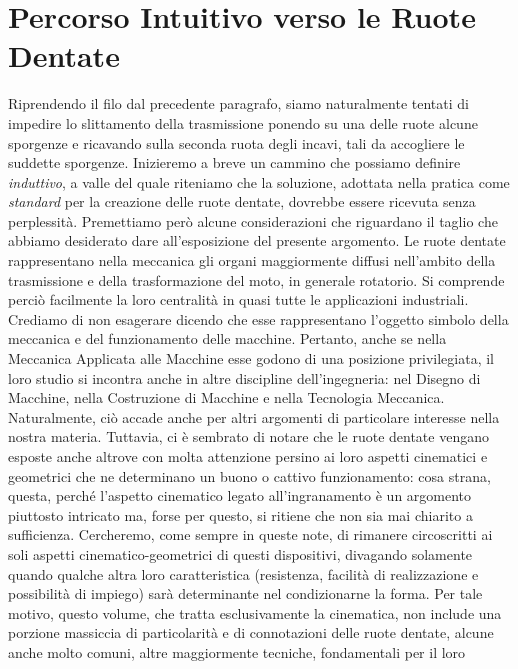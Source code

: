 \section{Percorso Intuitivo verso le Ruote Dentate} \label{percorso-ruote}

\noindent Riprendendo il filo dal precedente paragrafo,
siamo naturalmente tentati di impedire lo slittamento della trasmissione
ponendo su una delle ruote
alcune sporgenze e ricavando sulla seconda ruota degli incavi, tali da accogliere
le suddette sporgenze.
Inizieremo a breve un cammino che possiamo definire {\em induttivo}, a valle
del quale riteniamo che la soluzione,
adottata nella pratica come {\em standard} per la creazione delle
ruote dentate, dovrebbe essere ricevuta senza perplessit\`a. 
Premettiamo per\`o alcune considerazioni che riguardano il taglio che abbiamo
desiderato dare all'esposizione del presente argomento.
Le ruote dentate rappresentano nella meccanica gli organi maggiormente
diffusi nell'ambito della trasmissione e della trasformazione del moto, in
generale rotatorio. Si comprende perci\`o facilmente la loro
centralit\`a
in quasi tutte le applicazioni industriali. Crediamo di non esagerare dicendo
che esse rappresentano l'oggetto simbolo della meccanica e del funzionamento
delle macchine.
Pertanto, anche se nella Meccanica Applicata alle Macchine esse godono di una
posizione privilegiata, il loro studio si incontra anche in altre discipline
dell'ingegneria: nel Disegno di Macchine, nella Costruzione di Macchine e nella
Tecnologia Meccanica. Naturalmente, ci\`o accade anche per altri argomenti
di particolare interesse nella nostra 
materia. Tuttavia, ci \`e sembrato di notare 
che le ruote dentate vengano esposte anche altrove
con molta attenzione persino ai loro aspetti cinematici
e geometrici che ne determinano un
buono o cattivo funzionamento: cosa strana, questa, perch\'e l'aspetto
cinematico legato all'ingranamento \`e un argomento piuttosto intricato ma,
forse per questo, si ritiene che non sia mai chiarito a sufficienza.
Cercheremo, come sempre in queste note,
di rimanere circoscritti ai soli aspetti cinematico-geometrici
di questi dispositivi, divagando solamente quando qualche altra loro
caratteristica
(resistenza, facilit\`a di realizzazione e possibilit\`a di impiego) 
sar\`a determinante nel condizionarne la forma. Per tale motivo, questo volume,
che tratta esclusivamente la cinematica, non include
una porzione massiccia di particolarit\`a e di connotazioni delle
ruote dentate, alcune anche molto comuni, altre maggiormente 
tecniche, fondamentali per il loro
